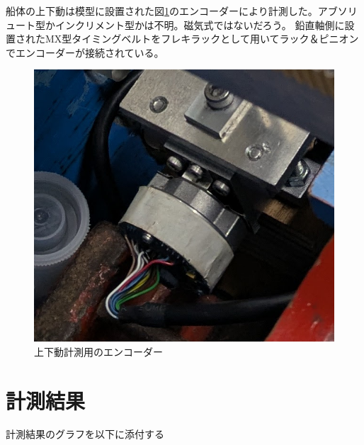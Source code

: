 \documentclass[dvipdfmx,a4paper]{jreport} %
\begin{document}
船体の上下動は模型に設置された図\ref{fig:encoder}のエンコーダーにより計測した。アブソリュート型かインクリメント型かは不明。磁気式ではないだろう。
鉛直軸側に設置されたMX型タイミングベルトをフレキラックとして用いてラック＆ピニオンでエンコーダーが接続されている。

\begin{figure}[H]
    \centering
    \includegraphics[width=0.5\linewidth]{summer/ship-experiment/2d-pool/pictures/encoder.png}
    \caption{上下動計測用のエンコーダー}
    \label{fig:encoder}
\end{figure}


\section{計測結果}
計測結果のグラフを以下に添付する
\end{document}
